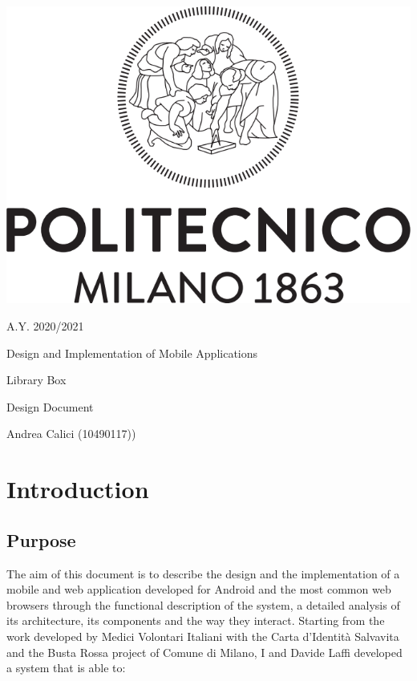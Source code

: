 \documentclass[oneside]{book}
\begin{document}
\begin{titlepage}
\centering
{}
\includegraphics[scale = 0.3]{logo.png}

{\LARGE A.Y. 2020/2021\par}

{\LARGE Design and Implementation of Mobile Applications\par}
{\LARGE Library Box\par}
{\LARGE Design Document\par}
{\large Andrea Calici (10490117))\par}
\end{titlepage}

{}

\tableofcontents
\newpage


\chapter{Introduction}
\section{Purpose}
The aim of this document is to describe the design and the implementation of a mobile and web application developed for Android and the most common web browsers through the functional description of the system, a detailed analysis of its architecture, its components and the way they interact.\newline
Starting from the work developed by Medici Volontari Italiani with the Carta d'Identità Salvavita and the Busta Rossa project of Comune di Milano, I and Davide Laffi developed a system that is able to:
\end{document}
